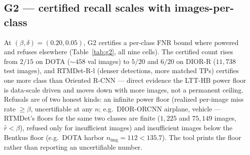 \documentclass[journal]{IEEEtran}
\begin{document}
\subsection{G2 --- certified recall scales with images-per-class}
At $(\beta,\delta)=(0.20,0.05)$, G2 certifies a per-class FNR bound where powered and refuses
elsewhere (Table~\ref{tab:g2}, all nine cells). The certified count rises from $2/15$ on DOTA ($\sim458$ val images) to
$5/20$ and $6/20$ on DIOR-R ($11{,}738$ test images), and RTMDet-R-l (denser detections, more matched TPs)
certifies one more class than Oriented R-CNN --- direct evidence the LTT-HB power floor is data-scale
driven and moves down with more images, not a permanent ceiling. Refusals are of two honest kinds: an
infinite power floor (realized per-image miss rate $\ge\beta$, uncertifiable at any $n$; e.g.\
DIOR-ORCNN airplane, vehicle --- RTMDet's floors for the same two classes are finite ($1{,}225$ and
$75{,}149$ images, $\hat r<\beta$), refused only for insufficient images) and insufficient images
below the Bentkus floor (e.g.\ DOTA harbor $n_{\mathrm{img}}{=}112<135.7$). The tool prints the floor rather than reporting an uncertifiable number.
\end{document}
